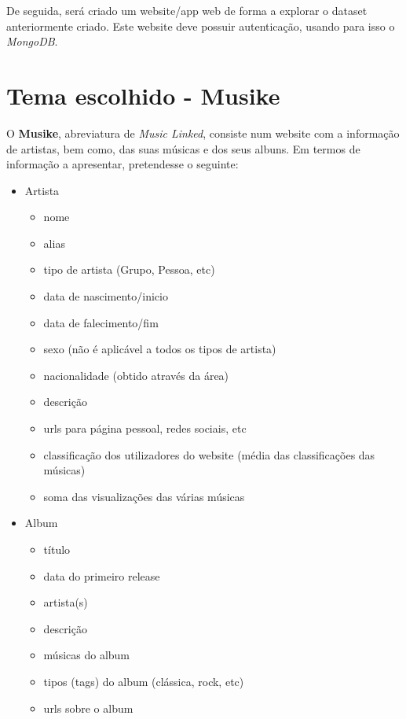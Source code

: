 \documentclass{article}
\begin{document}
De seguida, será criado um website/app web de forma a explorar o dataset anteriormente criado. Este website deve possuir autenticação, usando para isso o \textit{MongoDB}.


\section{Tema escolhido - \textbf{Musike}} \label{tema}

O \textbf{Musike}, abreviatura de \textit{Music Linked}, consiste num website com a informação de artistas, bem como, das suas músicas e dos seus albuns. Em termos de informação a apresentar, pretendesse o seguinte:
\begin{itemize}
    \item Artista
        \begin{itemize}
            \item nome
            \item alias
            \item tipo de artista (Grupo, Pessoa, etc)
            \item data de nascimento/inicio
            \item data de falecimento/fim
            \item sexo (não é aplicável a todos os tipos de artista)
            \item nacionalidade (obtido através da área)
            \item descrição
            \item urls para página pessoal, redes sociais, etc
            \item classificação dos utilizadores do website (média das classificações das músicas)
            \item soma das visualizações das várias músicas
        \end{itemize}
    \item Album
        \begin{itemize}
            \item título
            \item data do primeiro release
            \item artista(s)
            \item descrição
            \item músicas do album
            \item tipos (tags) do album (clássica, rock, etc)
            \item urls sobre o album

\end{itemize}
\end{itemize}
\end{document}
